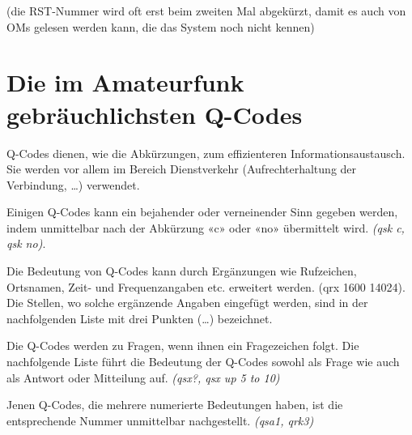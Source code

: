 (die RST-Nummer wird oft erst beim zweiten Mal abgekürzt, damit es auch von OMs gelesen werden kann, die das System noch nicht kennen)

\section{Die im Amateurfunk gebräuchlichsten Q-Codes}
Q-Codes dienen, wie die Abkürzungen, zum effizienteren Informationsaustausch. Sie werden vor allem im Bereich Dienstverkehr (Aufrechterhaltung der Verbindung, …) verwendet.

Einigen Q-Codes kann ein bejahender oder verneinender Sinn gegeben werden, indem unmittelbar nach der Abkürzung «c» oder «no» übermittelt wird. \textit{(qsk c, qsk no)}.

Die Bedeutung von Q-Codes kann durch Ergänzungen wie Rufzeichen, Ortsnamen, Zeit- und Frequenzangaben etc. erweitert werden. (qrx 1600 14024). Die Stellen, wo solche ergänzende Angaben eingefügt werden, sind in der nachfolgenden Liste mit drei Punkten (…) bezeichnet. 

Die Q-Codes werden zu Fragen, wenn ihnen ein Fragezeichen folgt. Die nachfolgende Liste führt die Bedeutung der Q-Codes sowohl als Frage wie auch als Antwort oder Mitteilung auf. \textit{(qsx?, qsx up 5 to 10)}

Jenen Q-Codes, die mehrere numerierte Bedeutungen haben, ist die entsprechende Nummer unmittelbar nachgestellt. \textit{(qsa1, qrk3)}

